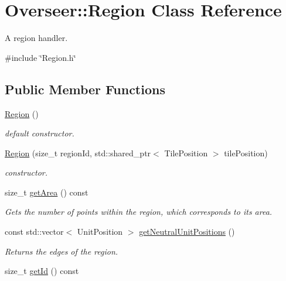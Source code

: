 \hypertarget{classOverseer_1_1Region}{}\section{Overseer\+:\+:Region Class Reference}
\label{classOverseer_1_1Region}


A region handler.  




{\ttfamily \#include \char`\"{}Region.\+h\char`\"{}}

\subsection*{Public Member Functions}
\begin{DoxyCompactItemize}
\item 
\mbox{\label{classOverseer_1_1Region_af241efba7a6115b1b1526924ad114ec1}} 
\hyperlink{classOverseer_1_1Region_af241efba7a6115b1b1526924ad114ec1}{Region} ()
\begin{DoxyCompactList}\small\item\em default constructor. \end{DoxyCompactList}\item 
\hyperlink{classOverseer_1_1Region_a8de3309b915589c86745a73c157d4a9f}{Region} (size\+\_\+t region\+Id, std\+::shared\+\_\+ptr$<$ Tile\+Position $>$ tile\+Position)
\begin{DoxyCompactList}\small\item\em constructor. \end{DoxyCompactList}\item 
size\+\_\+t \hyperlink{classOverseer_1_1Region_ae0c44ec954897475619ed302cf5a36e4}{get\+Area} () const
\begin{DoxyCompactList}\small\item\em Gets the number of points within the region, which corresponds to it\textquotesingle{}s area. \end{DoxyCompactList}\item 
const std\+::vector$<$ Unit\+Position $>$ \hyperlink{classOverseer_1_1Region_a9ac3f900c0b0b260ded354769337149d}{get\+Neutral\+Unit\+Positions} ()
\begin{DoxyCompactList}\small\item\em Returns the edges of the region. \end{DoxyCompactList}\item 
size\+\_\+t \hyperlink{classOverseer_1_1Region_aad3eddafae817b164847dafdf025d13c}{get\+Id} () const

\end{DoxyCompactItemize}

